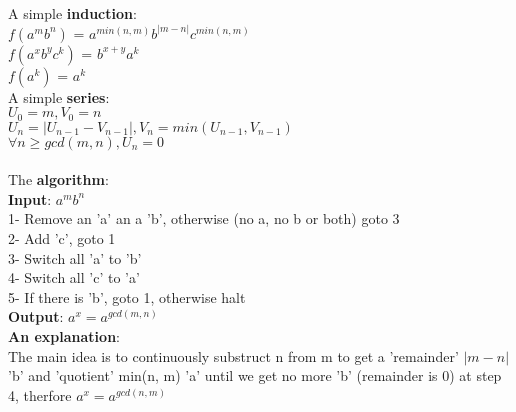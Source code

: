 \documentclass{article}
\begin{document}
\noindent A simple \textbf{induction}:\\
$f(a^mb^n)$ = $a^{min(n, m)}b^{|m - n|}c^{min(n, m)}$\\
$f(a^xb^yc^k)$ = $b^{x+y}a^k$\\
$f(a^k)$ = $a^k$\\
A simple \textbf{series}:\\
$U_0  = m, V_0 = n$\\
$U_n = |U_{n-1} - V_{n-1}|, V_n = min(U_{n-1}, V_{n-1})$\\
$ \forall n \geq gcd(m, n), U_n = 0$\\\\
The \textbf{algorithm}:\\
\textbf{Input}: $a^mb^n$\\
1- Remove an 'a' an a 'b', otherwise (no a, no b or both) goto 3\\
2- Add 'c', goto 1\\
3- Switch all 'a' to 'b'\\
4- Switch all 'c' to 'a'\\
5- If there is 'b', goto 1, otherwise halt\\
\textbf{Output}: $a^x = a^{gcd(m, n)}$\\

\textbf{An explanation}:\\
The main idea is to continuously substruct n from m to get
a 'remainder' $|m - n|$ 'b' and  'quotient'  min(n, m)  'a'
until we get no more 'b' (remainder is 0) at step 4, therfore
$a^x = a^{gcd(n, m)}$\\
\end{document}
